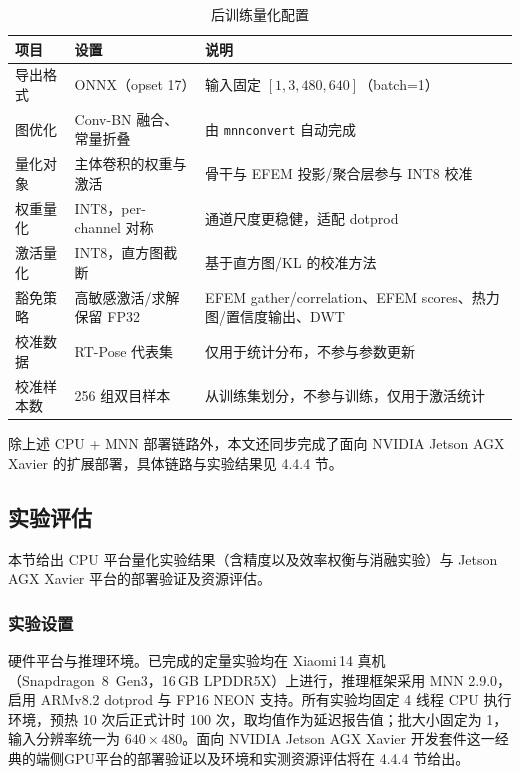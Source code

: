 \begin{table}[htbp]
  \centering
  \small
\caption{后训练量化配置}
  \label{tab:ptq_config}
  \begin{tabular}{@{}p{}p{}p{}@{}}
    \toprule
    项目 & 设置 & 说明 \\
    \midrule
    导出格式 & ONNX（opset 17） & 输入固定 $[1,3,480,640]$（batch=1） \\
    图优化 & Conv-BN 融合、常量折叠 & 由 \texttt{mnnconvert} 自动完成 \\
    量化对象 & 主体卷积的权重与激活 & 骨干与 EFEM 投影/聚合层参与 INT8 校准 \\
    权重量化 & INT8，per-channel 对称 & 通道尺度更稳健，适配 dotprod \\
    激活量化 & INT8，直方图截断 & 基于直方图/KL 的校准方法 \\
    豁免策略 & 高敏感激活/求解保留 FP32 & EFEM gather/correlation、EFEM scores、热力图/置信度输出、DWT \\
    校准数据 & RT-Pose 代表集 & 仅用于统计分布，不参与参数更新 \\
    校准样本数 & 256 组双目样本 & 从训练集划分，不参与训练，仅用于激活统计 \\
    \bottomrule
  \end{tabular}
\end{table}

除上述 CPU + MNN 部署链路外，本文还同步完成了面向 NVIDIA Jetson AGX Xavier 的扩展部署，具体链路与实验结果见 4.4.4 节。

\subsection{实验评估}

本节给出 CPU 平台量化实验结果（含精度以及效率权衡与消融实验）与 Jetson AGX Xavier 平台的部署验证及资源评估。

\subsubsection{实验设置}

硬件平台与推理环境。已完成的定量实验均在 Xiaomi\,14 真机（Snapdragon~8~Gen3，16\,GB LPDDR5X）上进行，推理框架采用 MNN 2.9.0，启用 ARMv8.2 dotprod 与 FP16 NEON 支持。所有实验均固定 4 线程 CPU 执行环境，预热 10 次后正式计时 100 次，取均值作为延迟报告值；批大小固定为 1，输入分辨率统一为 $640\times480$。面向 NVIDIA Jetson AGX Xavier 开发套件这一经典的端侧GPU平台的部署验证以及环境和实测资源评估将在 4.4.4 节给出。

